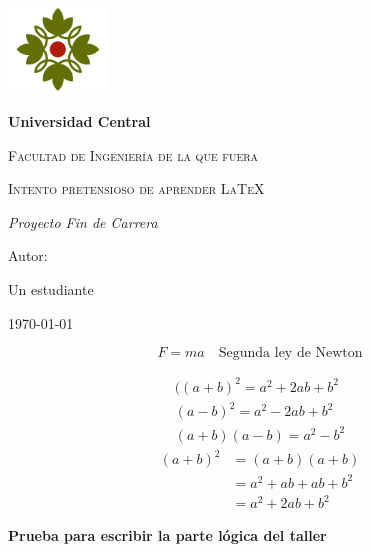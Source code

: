 \documentclass{article}
\begin{document}
  \begin{titlepage}
    \centering
    {\includegraphics[width=0.2\textwidth]{../../pictures/uc.png}\par}
    \vspace{1cm}
    {\bfseries\LARGE Universidad Central\par}
    \vspace{1cm}
    {\scshape\Large Facultad de Ingenier\'ia de la que fuera \par}
    \vspace{3cm}
    {\scshape\Huge Intento pretensioso de aprender \LaTeX \par}
    \vspace{3cm}
    {\itshape\Large Proyecto Fin de Carrera \par}
    \vfill
    {\Large Autor: \par}
    {\Large Un estudiante \par}
    \vfill
    {\Large \today \par}
  \end{titlepage}

  \begin{equation*}
    F = ma \quad\text{Segunda ley de Newton} %
  \end{equation*}

  \begin{align*}
    ((a+b)^2 = a^2 + 2ab + b^2\\
    (a-b)^2 = a^2 - 2ab + b^2\\
    (a+b)(a-b) = a^2 - b^2
  \end{align*}
  \begin{equation*}
    \begin{split}
      (a+b)^2& = (a+b)(a+b)\\
      & = a^2 + ab + ab + b^2\\
      & = a^2 + 2ab + b^2
    \end{split}
  \end{equation*}


  {\bfseries\LARGE Prueba para escribir la parte lógica del taller \par}
\end{document}
